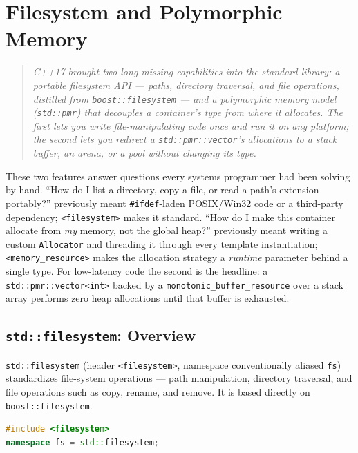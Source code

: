 \chapter{Filesystem and Polymorphic Memory}
\label{ch:c17-filesystem-pmr}

\begin{quote}
\emph{C++17 brought two long-missing capabilities into the standard library: a portable filesystem API --- paths, directory traversal, and file operations, distilled from \texttt{boost::filesystem} --- and a polymorphic memory model (\texttt{std::pmr}) that decouples a container's type from where it allocates. The first lets you write file-manipulating code once and run it on any platform; the second lets you redirect a \texttt{std::pmr::vector}'s allocations to a stack buffer, an arena, or a pool without changing its type.}
\end{quote}

These two features answer questions every systems programmer had been solving by hand. ``How do I list a directory, copy a file, or read a path's extension portably?'' previously meant \texttt{\#ifdef}-laden POSIX/Win32 code or a third-party dependency; \texttt{<filesystem>} makes it standard. ``How do I make this container allocate from \emph{my} memory, not the global heap?'' previously meant writing a custom \texttt{Allocator} and threading it through every template instantiation; \texttt{<memory\_resource>} makes the allocation strategy a \emph{runtime} parameter behind a single type. For low-latency code the second is the headline: a \texttt{std::pmr::vector<int>} backed by a \texttt{monotonic\_buffer\_resource} over a stack array performs zero heap allocations until that buffer is exhausted.

\section{\texttt{std::filesystem}: Overview}
\label{sec:c17-fs-overview}

\texttt{std::filesystem} (header \texttt{<filesystem>}, namespace conventionally aliased \texttt{fs}) standardizes file-system operations --- path manipulation, directory traversal, and file operations such as copy, rename, and remove. It is based directly on \texttt{boost::filesystem}.

\begin{lstlisting}[language=C++,caption={The conventional namespace alias}]
#include <filesystem>
namespace fs = std::filesystem;
\end{lstlisting}

